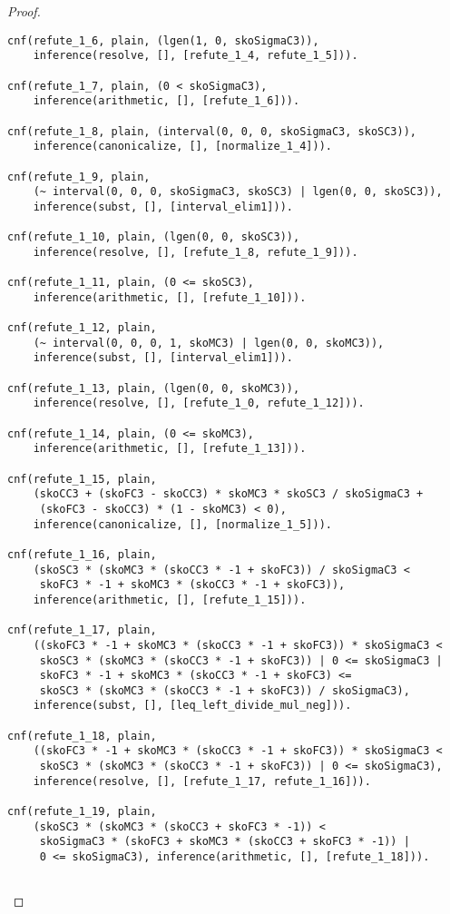 \begin{proof}
\begin{verbatim}
cnf(refute_1_6, plain, (lgen(1, 0, skoSigmaC3)),
    inference(resolve, [], [refute_1_4, refute_1_5])).

cnf(refute_1_7, plain, (0 < skoSigmaC3),
    inference(arithmetic, [], [refute_1_6])).

cnf(refute_1_8, plain, (interval(0, 0, 0, skoSigmaC3, skoSC3)),
    inference(canonicalize, [], [normalize_1_4])).

cnf(refute_1_9, plain,
    (~ interval(0, 0, 0, skoSigmaC3, skoSC3) | lgen(0, 0, skoSC3)),
    inference(subst, [], [interval_elim1])).

cnf(refute_1_10, plain, (lgen(0, 0, skoSC3)),
    inference(resolve, [], [refute_1_8, refute_1_9])).

cnf(refute_1_11, plain, (0 <= skoSC3),
    inference(arithmetic, [], [refute_1_10])).

cnf(refute_1_12, plain,
    (~ interval(0, 0, 0, 1, skoMC3) | lgen(0, 0, skoMC3)),
    inference(subst, [], [interval_elim1])).

cnf(refute_1_13, plain, (lgen(0, 0, skoMC3)),
    inference(resolve, [], [refute_1_0, refute_1_12])).

cnf(refute_1_14, plain, (0 <= skoMC3),
    inference(arithmetic, [], [refute_1_13])).

cnf(refute_1_15, plain,
    (skoCC3 + (skoFC3 - skoCC3) * skoMC3 * skoSC3 / skoSigmaC3 +
     (skoFC3 - skoCC3) * (1 - skoMC3) < 0),
    inference(canonicalize, [], [normalize_1_5])).

cnf(refute_1_16, plain,
    (skoSC3 * (skoMC3 * (skoCC3 * -1 + skoFC3)) / skoSigmaC3 <
     skoFC3 * -1 + skoMC3 * (skoCC3 * -1 + skoFC3)),
    inference(arithmetic, [], [refute_1_15])).

cnf(refute_1_17, plain,
    ((skoFC3 * -1 + skoMC3 * (skoCC3 * -1 + skoFC3)) * skoSigmaC3 <
     skoSC3 * (skoMC3 * (skoCC3 * -1 + skoFC3)) | 0 <= skoSigmaC3 |
     skoFC3 * -1 + skoMC3 * (skoCC3 * -1 + skoFC3) <=
     skoSC3 * (skoMC3 * (skoCC3 * -1 + skoFC3)) / skoSigmaC3),
    inference(subst, [], [leq_left_divide_mul_neg])).

cnf(refute_1_18, plain,
    ((skoFC3 * -1 + skoMC3 * (skoCC3 * -1 + skoFC3)) * skoSigmaC3 <
     skoSC3 * (skoMC3 * (skoCC3 * -1 + skoFC3)) | 0 <= skoSigmaC3),
    inference(resolve, [], [refute_1_17, refute_1_16])).

cnf(refute_1_19, plain,
    (skoSC3 * (skoMC3 * (skoCC3 + skoFC3 * -1)) <
     skoSigmaC3 * (skoFC3 + skoMC3 * (skoCC3 + skoFC3 * -1)) |
     0 <= skoSigmaC3), inference(arithmetic, [], [refute_1_18])).


\end{verbatim}
\end{proof}
